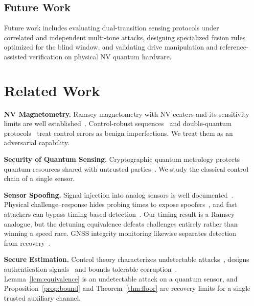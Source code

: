 \documentclass[conference]{IEEEtran}
\begin{document}
\subsection{Future Work}

Future work includes evaluating dual-transition sensing protocols under correlated and independent multi-tone attacks, designing specialized fusion rules optimized for the blind window, and validating drive manipulation and reference-assisted verification on physical NV quantum hardware.

\section{Related Work}
\label{sec:related}

\textbf{NV Magnetometry.} Ramsey magnetometry with NV centers and its sensitivity limits are well established~\cite{taylor2008magnetometer,rondin2014magnetometry,degen2017quantum,barry2020sensitivity}. Control-robust sequences~\cite{oshnik2022robust} and double-quantum protocols~\cite{fang2013quantumbeats,bauch2018ultralong,hart2021dq} treat control errors as benign imperfections. We treat them as an adversarial capability.

\textbf{Security of Quantum Sensing.} Cryptographic quantum metrology protects quantum resources shared with untrusted parties~\cite{shettell2022cryptographic}. We study the classical control chain of a single sensor.

\textbf{Sensor Spoofing.} Signal injection into analog sensors is well documented~\cite{kune2013ghost,shoukry2013abs}. Physical challenge--response hides probing times to expose spoofers~\cite{shoukry2015pycra}, and fast attackers can bypass timing-based detection~\cite{shin2016sampling}. Our timing result is a Ramsey analogue, but the detuning equivalence defeats challenges entirely rather than winning a speed race. GNSS integrity monitoring likewise separates detection from recovery~\cite{psiaki2016gnss,brown1992raim}.

\textbf{Secure Estimation.} Control theory characterizes undetectable attacks~\cite{pasqualetti2013attack}, designs authentication signals~\cite{mo2009replay} and bounds tolerable corruption~\cite{fawzi2014secure}. Lemma~\ref{lem:equivalence} is an undetectable attack on a quantum sensor, and Proposition~\ref{prop:bound} and Theorem~\ref{thm:floor} are recovery limits for a single trusted auxiliary channel.
\end{document}
